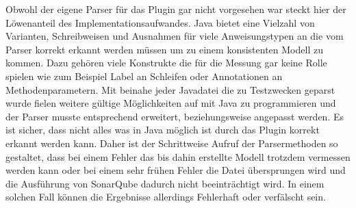 \documentclass[gb,ngerman]{stthesis}
\begin{document}
			Obwohl der eigene Parser für das Plugin gar nicht vorgesehen war steckt hier der Löwenanteil des Implementationsaufwandes. Java bietet eine Vielzahl von Varianten, Schreibweisen und Ausnahmen für viele Anweisungstypen an die vom Parser korrekt erkannt werden müssen um zu einem konsistenten Modell zu kommen. Dazu gehören viele Konstrukte die für die Messung gar keine Rolle spielen wie zum Beispiel Label an Schleifen oder Annotationen an Methodenparametern. Mit beinahe jeder Javadatei die zu Testzwecken geparst wurde fielen weitere gültige Möglichkeiten auf mit Java zu programmieren und der Parser musste entsprechend erweitert, beziehungsweise angepasst werden. Es ist sicher, dass nicht alles was in Java möglich ist durch das Plugin korrekt erkannt werden kann. Daher ist der Schrittweise Aufruf der Parsermethoden so gestaltet, dass bei einem Fehler das bis dahin erstellte Modell trotzdem vermessen werden kann oder bei einem sehr frühen Fehler die Datei übersprungen wird und die Ausführung von SonarQube dadurch nicht beeinträchtigt wird. In einem solchen Fall können die Ergebnisse allerdings Fehlerhaft oder verfälscht sein.
\end{document}

